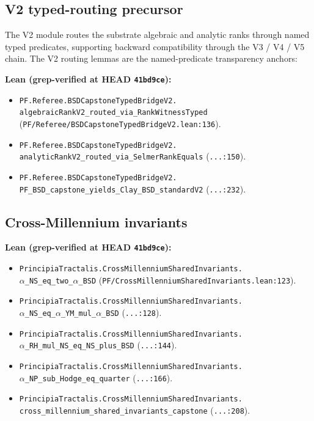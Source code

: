 \documentclass[11pt,a4paper]{article}
\theoremstyle{plain}
\theoremstyle{definition}
\theoremstyle{remark}
\begin{document}
\subsection{V2 typed-routing precursor}

The V2 module routes the substrate algebraic and analytic ranks
through named typed predicates, supporting backward compatibility
through the V3 / V4 / V5 chain. The V2 routing lemmas are the
named-predicate transparency anchors:

\textbf{Lean (grep-verified at HEAD \texttt{41bd9ce}):}
\begin{itemize}[leftmargin=*,nosep]
\item \texttt{PF.Referee.BSDCapstoneTypedBridgeV2.\\
   algebraicRankV2\_routed\_via\_RankWitnessTyped}
   (\texttt{PF/Referee/BSDCapstoneTypedBridgeV2.lean:136}).
\item \texttt{PF.Referee.BSDCapstoneTypedBridgeV2.\\
   analyticRankV2\_routed\_via\_SelmerRankEquals}
   (\texttt{...:150}).
\item \texttt{PF.Referee.BSDCapstoneTypedBridgeV2.\\
   PF\_BSD\_capstone\_yields\_Clay\_BSD\_standardV2}
   (\texttt{...:232}).
\end{itemize}

\subsection{Cross-Millennium invariants}

\textbf{Lean (grep-verified at HEAD \texttt{41bd9ce}):}
\begin{itemize}[leftmargin=*,nosep]
\item \texttt{PrincipiaTractalis.CrossMillenniumSharedInvariants.\\
   $\alpha$\_NS\_eq\_two\_$\alpha$\_BSD}
   (\texttt{PF/CrossMillenniumSharedInvariants.lean:123}).
\item \texttt{PrincipiaTractalis.CrossMillenniumSharedInvariants.\\
   $\alpha$\_NS\_eq\_$\alpha$\_YM\_mul\_$\alpha$\_BSD}
   (\texttt{...:128}).
\item \texttt{PrincipiaTractalis.CrossMillenniumSharedInvariants.\\
   $\alpha$\_RH\_mul\_NS\_eq\_NS\_plus\_BSD}
   (\texttt{...:144}).
\item \texttt{PrincipiaTractalis.CrossMillenniumSharedInvariants.\\
   $\alpha$\_NP\_sub\_Hodge\_eq\_quarter}
   (\texttt{...:166}).
\item \texttt{PrincipiaTractalis.CrossMillenniumSharedInvariants.\\
   cross\_millennium\_shared\_invariants\_capstone}
   (\texttt{...:208}).
\end{itemize}
\end{document}
